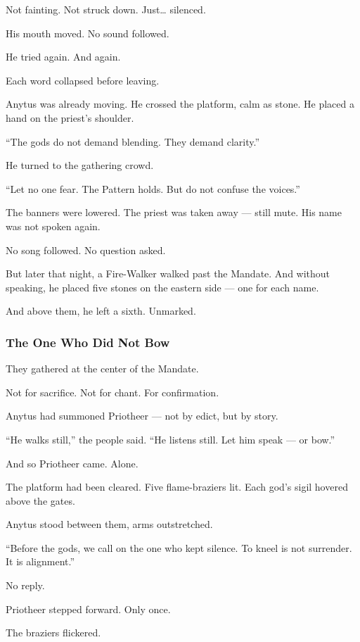 \documentclass[12pt]{article}
\begin{document}
Not fainting.  
Not struck down.  
Just… silenced.

His mouth moved.  
No sound followed.

He tried again.  
And again.

Each word collapsed before leaving.

Anytus was already moving.  
He crossed the platform, calm as stone.  
He placed a hand on the priest’s shoulder.

 “The gods do not demand blending.  
 They demand clarity.”

He turned to the gathering crowd.

 “Let no one fear.  
 The Pattern holds.  
 But do not confuse the voices.”

The banners were lowered.  
The priest was taken away — still mute.  
His name was not spoken again.

No song followed.  
No question asked.

But later that night, a Fire-Walker walked past the Mandate.  
And without speaking, he placed five stones on the eastern side —  
one for each name.

And above them, he left a sixth.  
Unmarked.

\dotfill

\subsubsection*{The One Who Did Not Bow}

They gathered at the center of the Mandate.

Not for sacrifice.  
Not for chant.  
For confirmation.

Anytus had summoned Priotheer — not by edict,  
but by story.

 “He walks still,” the people said.  
 “He listens still.  
 Let him speak — or bow.”

And so Priotheer came.  
Alone.

The platform had been cleared.  
Five flame-braziers lit.  
Each god’s sigil hovered above the gates.

Anytus stood between them, arms outstretched.

 “Before the gods, we call on the one who kept silence.  
 To kneel is not surrender.  
It is alignment.”

No reply.

Priotheer stepped forward.  
Only once.

The braziers flickered.
\end{document}
